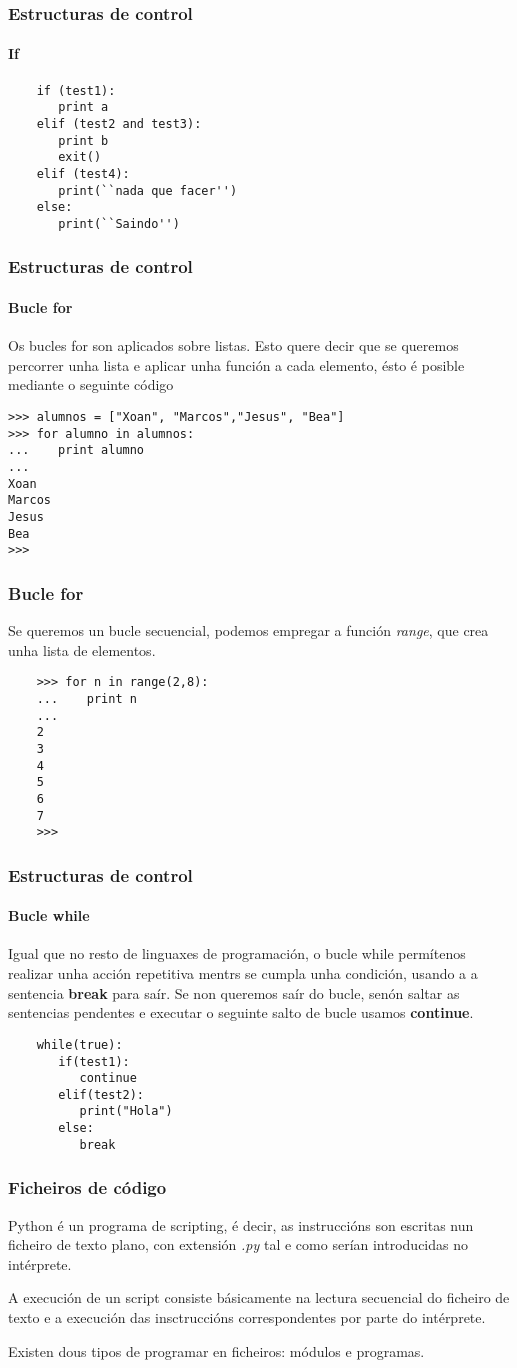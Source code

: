 \begin{frame}[fragile]
  \frametitle{Estructuras de control}
  \framesubtitle{If}
  \small
  \begin{verbatim}
    if (test1):
       print a
    elif (test2 and test3):
       print b
       exit()
    elif (test4):
       print(``nada que facer'')
    else:
       print(``Saindo'')
  \end{verbatim}
  \normalsize
\end{frame}

\begin{frame}[fragile]
  \frametitle{Estructuras de control}
  \framesubtitle{Bucle for}
  Os bucles for son aplicados sobre listas. Esto quere decir que se queremos
  percorrer unha lista e aplicar unha función a cada elemento, ésto é posible
  mediante o seguinte código
  \small
\begin{verbatim}
>>> alumnos = ["Xoan", "Marcos","Jesus", "Bea"]
>>> for alumno in alumnos:
...    print alumno
... 
Xoan
Marcos
Jesus
Bea
>>> 
\end{verbatim}
  \normalsize
\end{frame}

\begin{frame}[fragile]
  \frametitle{Bucle for}
  Se queremos un bucle secuencial, podemos empregar a función \emph{range}, que
  crea unha lista de elementos.
  \small
  \begin{verbatim}
    >>> for n in range(2,8):
    ...    print n
    ... 
    2
    3
    4
    5
    6
    7
    >>> 
  \end{verbatim}
  \normalsize
\end{frame}

\begin{frame}[fragile]
  \frametitle{Estructuras de control}
  \framesubtitle{Bucle while}
  Igual que no resto de linguaxes de programación, o bucle while permítenos
  realizar unha acción repetitiva mentrs se cumpla unha condición, usando a a
  sentencia \textbf{break} para saír. Se non queremos saír do bucle, senón
  saltar as sentencias pendentes e executar o seguinte salto de bucle usamos
  \textbf{continue}.
  \small
\begin{verbatim}
    while(true):
       if(test1):
          continue
       elif(test2):
          print("Hola")
       else:
          break    
\end{verbatim}
  \normalsize
\end{frame}

\begin{frame}
  \frametitle{Ficheiros de código}
  Python é un programa de scripting, é decir, as instruccións son escritas nun
  ficheiro de texto plano, con extensión \emph{.py} tal e como serían
  introducidas no intérprete.  

  A execución de un script consiste básicamente na lectura secuencial do
  ficheiro de texto e a execución das insctruccións correspondentes por parte do
  intérprete. 

  Existen dous tipos de programar en ficheiros: módulos e programas.
\end{frame}

